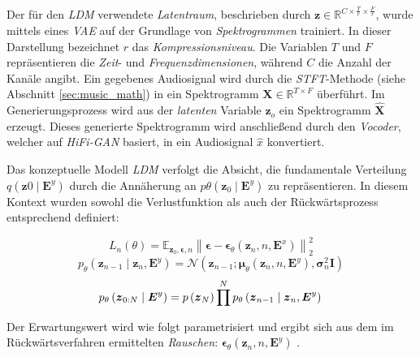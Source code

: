 \documentclass[
  a4paper,  %
  twoside,  %
  bibliography=totoc,
  headsepline,
  cleardoublepage=empty,
  parskip=half,
  draft=false
]{scrbook}
\begin{document}
Der für den \emph{LDM} verwendete \emph{Latentraum}, beschrieben durch $\boldsymbol{z} \in \mathbb{R}^{C \times \frac{T}{r} \times \frac{F}{r}}$, wurde mittels eines \emph{VAE} auf der Grundlage von \emph{Spektrogrammen} trainiert. In dieser Darstellung bezeichnet $r$ das \emph{Kompressionsniveau}. Die Variablen $T$ und $F$ repräsentieren die \emph{Zeit}- und \emph{Frequenzdimensionen}, während $C$ die Anzahl der Kanäle angibt. Ein gegebenes Audiosignal wird durch die \emph{STFT}-Methode (siehe Abschnitt \ref{sec:music_math}) in ein Spektrogramm $\boldsymbol{X} \in \mathbb{R}^{T \times F}$ überführt. Im Generierungsprozess wird aus der \emph{latenten} Variable $\hat{\boldsymbol{z}}_o$ ein Spektrogramm $\hat{\boldsymbol{X}}$ erzeugt. Dieses generierte Spektrogramm wird anschließend durch den \emph{Vocoder}, welcher auf \emph{HiFi-GAN} \cite{kong_hifi-gan_2020} basiert, in ein Audiosignal $\hat{x}$ konvertiert. \cite{liu_audioldm_2023}

Das konzeptuelle Modell \emph{LDM} verfolgt die Absicht, die fundamentale Verteilung $q\left(\boldsymbol{z}0 \mid \boldsymbol{E}^y\right)$ durch die Annäherung an $p\theta\left(\boldsymbol{z}_0 \mid \boldsymbol{E}^y\right)$ zu repräsentieren. In diesem Kontext wurden sowohl die Verlustfunktion als auch der Rückwärtsprozess entsprechend definiert: \cite{liu_audioldm_2023}

\begin{equation}
    L_n(\theta)=\mathbb{E}_{\boldsymbol{z}_0, \boldsymbol{\epsilon}, n}\left\|\boldsymbol{\epsilon}-\boldsymbol{\epsilon}_\theta\left(\boldsymbol{z}_n, n, \boldsymbol{E}^x\right)\right\|_2^2
\end{equation}
\begin{equation}
    p_\theta\left(\boldsymbol{z}_{n-1} \mid \boldsymbol{z}_n, \boldsymbol{E}^y\right)=\mathcal{N}\left(\boldsymbol{z}_{n-1} ; \boldsymbol{\mu}_\theta\left(\boldsymbol{z}_n, n, \boldsymbol{E}^y\right), \boldsymbol{\sigma}_n^2 \boldsymbol{I}\right)
\end{equation}
\begin{equation}
    p_\theta\left(\boldsymbol{z}_{0: N} \mid \boldsymbol{E}^y\right)=p\left(\boldsymbol{z}_N\right) \prod^N p_\theta\left(\boldsymbol{z}_{n-1} \mid \boldsymbol{z}_n, \boldsymbol{E}^y\right) \\
\end{equation}

Der Erwartungswert wird wie folgt parametrisiert und ergibt sich aus dem im Rückwärtsverfahren ermittelten \emph{Rauschen}: $\boldsymbol{\epsilon}_\theta\left(\boldsymbol{z}_n, n, \boldsymbol{E}^y\right)$ \cite{liu_audioldm_2023}.
\end{document}
